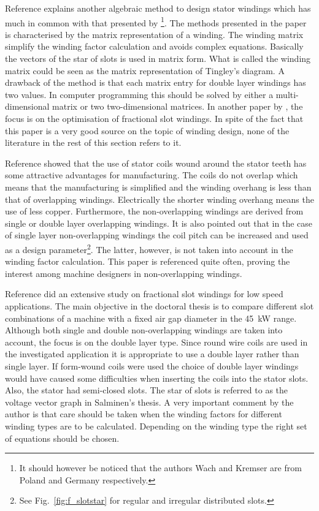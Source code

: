 Reference \cite{REF-00452} explains another algebraic method to design stator windings which has much in common with that presented by \cite{REF-00266}\footnote{It should however be noticed that the authors Wach and Kremser are from Poland and Germany respectively.}.  The methods presented in the paper is characterised by the matrix representation of a winding. The winding matrix simplify the winding factor calculation and avoids complex equations. Basically the vectors of the star of slots is used in matrix form. What is called the winding matrix could be seen as the matrix representation of Tingley's diagram. A drawback of the method is that each matrix entry for double layer windings has two values. In computer programming this should be solved by either a multi-dimensional matrix or two two-dimensional matrices. In another paper by \cite{REF-00454}, the focus is on the optimisation of fractional slot windings. In spite of the fact that this paper is a very good source on the topic of winding design, none of the literature in the rest of this section refers to it.
 
Reference \cite{REF-00754} showed that the use of stator coils wound around the stator teeth has some attractive advantages for manufacturing. The coils do not overlap which means that the manufacturing is simplified and the winding overhang is less than that of overlapping windings. Electrically the shorter winding overhang means the use of less copper. Furthermore, the non-overlapping windings are derived from single or double layer overlapping windings. It is also pointed out that in the case of single layer non-overlapping windings the coil pitch can be increased and used as a design parameter\footnote{See Fig.~\ref{fig:f_slotstar} for regular and irregular distributed slots.}. The latter, however, is not taken into account in the winding factor calculation. This paper is referenced quite often, proving the interest among machine designers in non-overlapping windings.  

Reference \cite{REF-01055} did an extensive study on fractional slot windings for low speed applications. The main objective in the doctoral thesis is to compare different slot combinations of a machine with a fixed air gap diameter in the \SI{45}{kW} range. Although both single and double non-overlapping windings are taken into account, the focus is on the double layer type. Since round wire coils are used in the investigated application it is appropriate to use a double layer rather than single layer. If form-wound coils were used the choice of double layer windings would have caused some difficulties when inserting the coils into the stator slots. Also, the stator had semi-closed slots. The star of slots is referred to as the voltage vector graph in Salminen's thesis. A very important comment by the author is that care should be taken when the winding factors for different winding types are to be calculated. Depending on the winding type the right set of equations should be chosen. 

